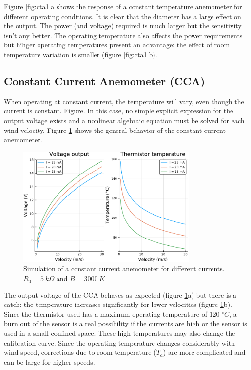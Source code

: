 \documentclass[10pt,fleqn,a4paper,twoside]{article}
\begin{document}
Figure \ref{fig:cta1}a shows the response of a constant temperature anemometer for different operating conditions. It is clear that the diameter has a large effect on the output. The power (and voltage) required is much larger but the sensitivity isn't any better. The operating temperature also affects the power requirements but hihger operating temperatures present an advantage: the effect of room temperature variation is smaller (figure \ref{fig:cta1}b).

\subsection{Constant Current Anemometer (CCA)}

When operating at constant current, the temperature will vary, even though the current is constant. Figure. In this case, no simple explicit expression for the output voltage exists and a nonlinear algebraic equation must be solved for each wind velocity. Figure \ref{fig:cca1} shows the general behavior of the constant current anemometer.

\begin{figure}[h!]
\centering
\includegraphics[width=0.8\textwidth]{../../figures/CCA.pdf}
\caption{Simulation of a constant current anemometer for different currents. $R_0 = 5\:k\Omega$ and $B = 3000\:K$}
\label{fig:cca1}
\end{figure}

The output voltage of the CCA behaves as expected (figure \ref{fig:cca1}a) but there is a catch: the temperature increases significantly for lower velocities (figure \ref{fig:cca1}b). Since the thermistor used has a maximum operating temperature of 120 $^\circ C$, a burn out of the sensor is a real possibility if the currents are high or the sensor is used in a small confined space. These high temperatures may also change the calibration curve. Since the operating temperature changes considerably with wind speed, corrections due to room temperature ($T_a$) are more complicated and can be large for higher speeds.
\end{document}
